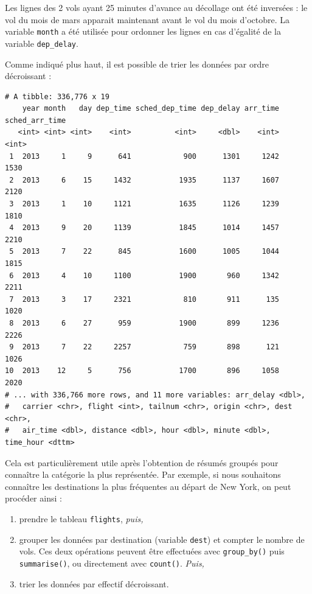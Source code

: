 \documentclass[a4paperpaper,]{article}
\newenvironment{Shaded}{\begin{snugshade}}{\end{snugshade}}
\newcommand{\KeywordTok}[1]{\textcolor[rgb]{0.12,0.11,0.11}{\textbf{#1}}}
\newcommand{\NormalTok}[1]{\textcolor[rgb]{0.12,0.11,0.11}{#1}}
\newcommand{\OperatorTok}[1]{\textcolor[rgb]{0.12,0.11,0.11}{#1}}
\newcommand{\StringTok}[1]{\textcolor[rgb]{0.75,0.01,0.01}{#1}}
\providecommand{\tightlist}{%
  \setlength{\itemsep}{0pt}\setlength{\parskip}{0pt}}
\theoremstyle{definition}
\theoremstyle{definition}
\theoremstyle{definition}
\theoremstyle{remark}
\begin{document}
Les lignes des 2 vols ayant 25 minutes d'avance au décollage ont été
inversées : le vol du mois de mars apparait maintenant avant le vol du
mois d'octobre. La variable \texttt{month} a été utilisée pour ordonner
les lignes en cas d'égalité de la variable \texttt{dep\_delay}.

Comme indiqué plus haut, il est possible de trier les données par ordre
décroissant :

\begin{Shaded}
\end{Shaded}

\begin{verbatim}
# A tibble: 336,776 x 19
    year month   day dep_time sched_dep_time dep_delay arr_time sched_arr_time
   <int> <int> <int>    <int>          <int>     <dbl>    <int>          <int>
 1  2013     1     9      641            900      1301     1242           1530
 2  2013     6    15     1432           1935      1137     1607           2120
 3  2013     1    10     1121           1635      1126     1239           1810
 4  2013     9    20     1139           1845      1014     1457           2210
 5  2013     7    22      845           1600      1005     1044           1815
 6  2013     4    10     1100           1900       960     1342           2211
 7  2013     3    17     2321            810       911      135           1020
 8  2013     6    27      959           1900       899     1236           2226
 9  2013     7    22     2257            759       898      121           1026
10  2013    12     5      756           1700       896     1058           2020
# ... with 336,766 more rows, and 11 more variables: arr_delay <dbl>,
#   carrier <chr>, flight <int>, tailnum <chr>, origin <chr>, dest <chr>,
#   air_time <dbl>, distance <dbl>, hour <dbl>, minute <dbl>, time_hour <dttm>
\end{verbatim}

Cela est particulièrement utile après l'obtention de résumés groupés
pour connaître la catégorie la plus représentée. Par exemple, si nous
souhaitons connaître les destinations la plus fréquentes au départ de
New York, on peut procéder ainsi :

\begin{enumerate}
\def\labelenumi{\arabic{enumi}.}
\tightlist
\item
  prendre le tableau \texttt{flights}, \emph{puis,}
\item
  grouper les données par destination (variable \texttt{dest}) et
  compter le nombre de vols. Ces deux opérations peuvent être effectuées
  avec \texttt{group\_by()} puis \texttt{summarise()}, ou directement
  avec \texttt{count()}. \emph{Puis,}
\item
  trier les données par effectif décroissant.
\end{enumerate}
\end{document}
